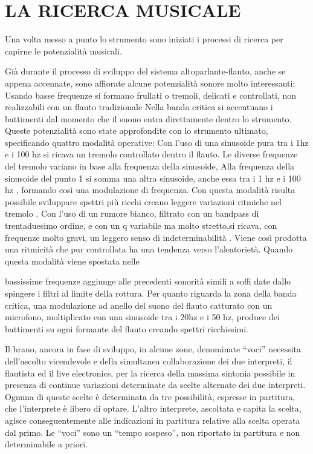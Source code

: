 
\chapter{LA RICERCA MUSICALE}
\label{chp:ricerca}

Una volta messo a punto  lo strumento sono iniziati i processi di ricerca  per capirne le potenzialità musicali.

Già durante il processo di  sviluppo del sistema altoparlante-flauto, anche se appena accennate,  sono affiorate alcune potenzialità sonore molto interessanti:
Usando  basse frequenze si formano frullati o tremoli, delicati e controllati, non realizzabili con un flauto tradizionale
 Nella banda critica si accentuano i battimenti dal momento che il suono entra direttamente dentro lo strumento.
Queste potenzialità sono state approfondite con lo strumento ultimato, specificando quattro modalità operative:
Con l’uso di una sinusoide pura tra i 1hz e i 100 hz si ricava un tremolo controllato dentro il flauto. Le diverse  frequenze del tremolo variano  in base alla frequenza della sinusoide,
Alla frequenza della sinusoide del punto 1 si somma  una altra sinusoide, anche essa tra i 1 hz e i 100 hz , formando così una modulazione di frequenza.  Con questa modalità risulta possibile sviluppare spettri più ricchi creano leggere variazioni ritmiche  nel tremolo .
Con l’uso di un rumore bianco, filtrato con un bandpass di trentaduesimo ordine, e  con un q variabile ma  molto stretto,si ricava, con frequenze molto gravi, un leggero senso di indeterminabilità . Viene così prodotta  una ritmicità che pur controllata ha una tendenza verso l’aleatorietà.          Quando questa modalità viene  spostata  nelle

bassissime frequenze aggiunge alle precedenti sonorità simili a soffi date dallo spingere i filtri al limite della rottura.
Per quanto riguarda la zona della  banda critica, una modulazione ad anello del suono del flauto catturato con un microfono, moltiplicato   con una sinusoide tra i 20hz e i 50 hz, produce  dei battimenti su ogni formante del flauto creando spettri ricchissimi.

Il brano, ancora in fase di sviluppo, in alcune zone, denominate “voci” necessita dell’ascolto vicendevole e della simultanea collaborazione  dei due interpreti, il flautista ed il live electronics, per la ricerca della massima sintonia possibile in presenza di continue variazioni determinate da scelte alternate dei due interpreti.
Ognuna di queste scelte è determinata da tre possibilità, espresse in partitura,  che l’interprete è libero di optare. L’altro interprete, ascoltata e capita la scelta, agisce conseguentemente alle indicazioni in partitura relative alla scelta operata dal primo.
Le “voci” sono un “tempo sospeso”, non riportato in partitura e non determinabile a priori.

